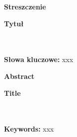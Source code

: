 \documentclass[12pt, twoside, openany]{mwrep}
\begin{document}
\thispagestyle{empty}
\newpage
{}

\newpage
\setcounter{page}{1}

\thispagestyle{empty}
\centerline{\bf Streszczenie}
\centerline{\bf Tytuł}
\noindent\textit{\lipsum[1-4]}\\
\\
\textbf{Słowa kluczowe:} xxx
\clearpage

\thispagestyle{empty}
\centerline{\bf Abstract}
\centerline{\bf Title}
\noindent\textit{\lipsum[1-4]}\\
\\
\textbf{Keywords:} xxx
\newpage
\thispagestyle{empty}
\begin{figure}[H]
\vspace{-55pt}%
\noindent{}
\end{figure}
\newpage
\end{document}
